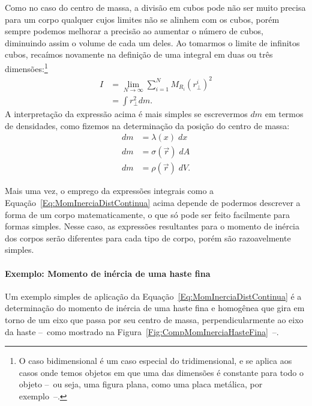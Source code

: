 Como no caso do centro de massa, a divisão em cubos pode não ser muito precisa para um corpo qualquer cujos limites não se alinhem com os cubos, porém sempre podemos melhorar a precisão ao aumentar o número de cubos, diminuindo assim o volume de cada um deles. Ao tomarmos o limite de infinitos cubos, recaímos novamente na definição de uma integral em duas ou três dimensões:\footnote{O caso bidimensional é um caso especial do tridimensional, e se aplica aos casos onde temos objetos em que uma das dimensões é constante para todo o objeto --~ou seja, uma figura plana, como uma placa metálica, por exemplo~--.}
\begin{align}
    I &= \lim_{N \to \infty} \sum_{i = 1}^N M_{R_i} (r_\perp^i)^2 \\
    &= \int r_\perp^2 dm. \label{Eq:MomInerciaDistContinua}
\end{align}
%
A interpretação da expressão acima é mais simples se escrevermos $dm$ em termos de densidades, como fizemos na determinação da posição do centro de massa:
\begin{align}
    dm &= \lambda(x) \; dx \\
    dm &= \sigma(\vec{r}) \;dA \\
    dm &= \rho(\vec{r}) \; dV.
\end{align}

Mais uma vez, o emprego da expressões integrais como a Equação~\eqref{Eq:MomInerciaDistContinua} acima depende de podermos descrever a forma de um corpo matematicamente, o que só pode ser feito facilmente para formas simples. Nesse caso, as expressões resultantes para o momento de inércia dos corpos serão diferentes para cada tipo de corpo, porém são razoavelmente simples.

\paragraph{Exemplo: Momento de inércia de uma haste fina}

Um exemplo simples de aplicação da Equação~\eqref{Eq:MomInerciaDistContinua} é a determinação do momento de inércia de uma haste fina  e homogênea que gira em torno de um eixo que passa por seu centro de massa, perpendicularmente ao eixo da haste --~como mostrado na Figura~\ref{Fig:CompMomInerciaHasteFina}~--.

